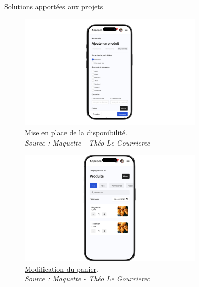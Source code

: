 \documentclass{beamer}
\begin{document}
\begin{frame}{Solutions apportées aux projets}
\begin{center}
		 {
			\addtocounter{figure}{1}
			\begin{figure}[t]
  				\includegraphics[height=5.5cm]{../img/maquette/disponibilite_produit.png}
				\caption{	
					\centering			
  					\href{https://github.com/Matteo-K/Soutenance_E-delic/blob/main/img/maquette/disponibilite_produit.png}{\underline{Mise en place de la disponibilité}}.\\
  					\textit{Source : Maquette - Théo Le Gourrierec}
				}
  				\label{fig:disponibilite_produit}
  			\end{figure}
		}
		
		\only<4> {
			\addtocounter{figure}{2}
			\begin{figure}[t]
  				\includegraphics[height=5.5cm]{../img/maquette/controlle_acces_client.png}
				\caption{
					\centering
  					\href{https://github.com/Matteo-K/Soutenance_E-delic/blob/main/img/maquette/controlle_acces_client.png}{\underline{Modification du panier}}.\\
  					\textit{Source : Maquette - Théo Le Gourrierec}
				}
  				\label{fig:modification_panier}
  			\end{figure}
		}
		

\end{center}
\end{frame}
\end{document}
